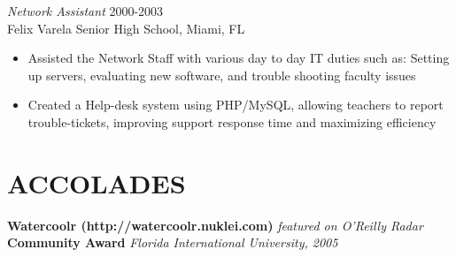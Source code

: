\documentclass[margin]{res}
\begin{document}
\begin{resume}
                   {\sl Network Assistant} \hfill        2000-2003 \\
                   Felix Varela Senior High School, Miami, FL
                   \begin{itemize}  \itemsep -2pt %
                   \item Assisted the Network Staff with various day to day IT duties such as:
                     Setting up servers, evaluating new software, and trouble shooting faculty issues
                   \item Created a Help-desk system using PHP/MySQL, allowing teachers to
                     report trouble-tickets, improving support response time and maximizing
                     efficiency
                   \end{itemize} 
                   
                   \section{ACCOLADES}
                           {\bf Watercoolr (http://watercoolr.nuklei.com) }{\it featured on O'Reilly Radar} \\
                           {\bf Community Award }{\it Florida International University, 2005}


 \end{resume}
\end{document}
